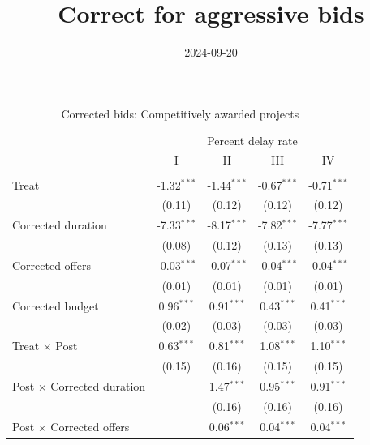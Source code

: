 \documentclass[
]{article}
\title{Correct for aggressive bids}
\author{}
\date{\vspace{-2.5em}2024-09-20}
\begin{document}
\maketitle

\begin{table}[htbp]
   \caption{Corrected bids: Competitively awarded projects}
   \centering
   \small
   \begin{tabular}{lcccc}
      \toprule
       & \multicolumn{4}{c}{Percent delay rate}\\
                                        & I             & II            & III           & IV\\  
      \midrule \\
      Treat                             & -1.32$^{***}$ & -1.44$^{***}$ & -0.67$^{***}$ & -0.71$^{***}$\\   
                                        & (0.11)        & (0.12)        & (0.12)        & (0.12)\\   
      Corrected duration                & -7.33$^{***}$ & -8.17$^{***}$ & -7.82$^{***}$ & -7.77$^{***}$\\   
                                        & (0.08)        & (0.12)        & (0.13)        & (0.13)\\   
      Corrected offers                  & -0.03$^{***}$ & -0.07$^{***}$ & -0.04$^{***}$ & -0.04$^{***}$\\   
                                        & (0.01)        & (0.01)        & (0.01)        & (0.01)\\   
      Corrected budget                  & 0.96$^{***}$  & 0.91$^{***}$  & 0.43$^{***}$  & 0.41$^{***}$\\   
                                        & (0.02)        & (0.03)        & (0.03)        & (0.03)\\   
      Treat $\times$ Post               & 0.63$^{***}$  & 0.81$^{***}$  & 1.08$^{***}$  & 1.10$^{***}$\\   
                                        & (0.15)        & (0.16)        & (0.15)        & (0.15)\\   
      Post $\times$ Corrected duration  &               & 1.47$^{***}$  & 0.95$^{***}$  & 0.91$^{***}$\\   
                                        &               & (0.16)        & (0.16)        & (0.16)\\   
      Post $\times$ Corrected offers    &               & 0.06$^{***}$  & 0.04$^{***}$  & 0.04$^{***}$\\   

\end{tabular}
\end{table}
\end{document}
